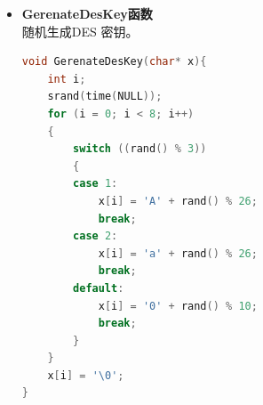 \documentclass[UTF8,a4paper,10pt]{ctexart}
\begin{document}
\begin{itemize}
\begin{lstlisting}[language = C++]
    //select model
    fd_set cHandleSet;
    struct timeval tv;
    int nRet;
    while(1){
        FD_ZERO(&cHandleSet);
        FD_SET(nSock, &cHandleSet);
        FD_SET(0, &cHandleSet);
        tv.tv_sec = 1;
        tv.tv_usec = 0;
        nRet = select(nSock>0? nSock+ 1:1, &cHandleSet, NULL, NULL, &tv);
        if(nRet < 0){
            printf("Select error!\n");
            break;
        }
        if(nRet == 0){
            continue;
        }
        if(FD_ISSET(nSock,&cHandleSet)){
            bzero(&strSocketBuffer, BUFFERSIZE);
            int nLength = 0;
            nLength = TotalRecv(nSock, strSocketBuffer,BUFFERSIZE,0);
            if(nLength !=BUFFERSIZE) break;
            else{
                int nLen = BUFFERSIZE;
                cDes.Decry(strSocketBuffer,BUFFERSIZE,strDecryBuffer,nLen,pKey,8);
                strDecryBuffer[BUFFERSIZE-1]=0;
                if(strDecryBuffer[0]!=0&&strDecryBuffer[0]!='\n'){
                    printf("Receive message form <%s>: %s",pRemoteName,strDecryBuffer);
                    if(0==memcmp("quit",strDecryBuffer,4)){
                        printf("Quit!\n");
                        break;
                    }
                }
            }
        }
        if(FD_ISSET(0,&cHandleSet)){
            bzero(&strStdinBuffer, BUFFERSIZE);
            while(strStdinBuffer[0]==0){
                if (fgets(strStdinBuffer, BUFFERSIZE, stdin) == NULL){
                    continue;
                }
            }
            int nLen = BUFFERSIZE;
            cDes.Encry(strStdinBuffer,BUFFERSIZE,strEncryBuffer,nLen,pKey,8);
            if(send(nSock, strEncryBuffer, BUFFERSIZE,0)!=BUFFERSIZE){
                perror("send");
            }else{
                if(0==memcmp("quit",strStdinBuffer,4)){
                    printf("Quit!\n");
                    break;
                }
            }
        }
    }
}
  \end{lstlisting}
  \item \textbf{GerenateDesKey函数} \\
  随机生成DES 密钥。
  \begin{lstlisting}[language = C++]
void GerenateDesKey(char* x){
    int i;
    srand(time(NULL));
    for (i = 0; i < 8; i++)
    {
        switch ((rand() % 3))
        {
        case 1:
            x[i] = 'A' + rand() % 26;
            break;
        case 2:
            x[i] = 'a' + rand() % 26;
            break;
        default:
            x[i] = '0' + rand() % 10;
            break;
        }
    }
    x[i] = '\0';
}
  \end{lstlisting}
\end{itemize}
\end{document}
